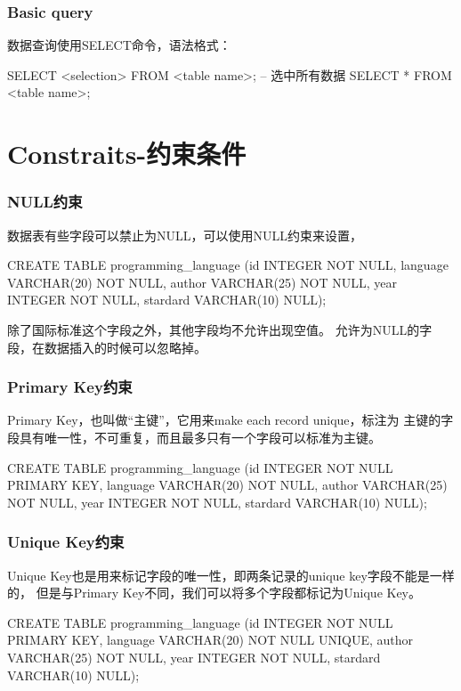 \documentclass[a4paper,11pt]{article}
\begin{document}
\section[Basic query]{Basic query}
数据查询使用SELECT命令，语法格式：

\begin{sqlcode}
SELECT <selection> FROM <table name>;
-- 选中所有数据
SELECT * FROM <table name>;
\end{sqlcode}


\part[Constraits-约束条件]{Constraits-约束条件}
\section[NULL约束]{NULL约束}
数据表有些字段可以禁止为NULL，可以使用NULL约束来设置，

\begin{sqlcode}
CREATE TABLE programming_language
(id INTEGER NOT NULL,
 language VARCHAR(20) NOT NULL,
 author VARCHAR(25) NOT NULL,
 year INTEGER NOT NULL,
 stardard VARCHAR(10) NULL);
\end{sqlcode}

除了国际标准这个字段之外，其他字段均不允许出现空值。
允许为NULL的字段，在数据插入的时候可以忽略掉。

\section[Primary Key约束]{Primary Key约束}
Primary Key，也叫做“主键”，它用来make each record unique，标注为
主键的字段具有唯一性，不可重复，而且最多只有一个字段可以标准为主键。

\begin{sqlcode}
CREATE TABLE programming_language
(id INTEGER NOT NULL PRIMARY KEY,
 language VARCHAR(20) NOT NULL,
 author VARCHAR(25) NOT NULL,
 year INTEGER NOT NULL,
 stardard VARCHAR(10) NULL);
\end{sqlcode}

\section[Unique Key约束]{Unique Key约束}
Unique Key也是用来标记字段的唯一性，即两条记录的unique key字段不能是一样的，
但是与Primary Key不同，我们可以将多个字段都标记为Unique Key。

\begin{sqlcode}
CREATE TABLE programming_language
(id INTEGER NOT NULL PRIMARY KEY,
 language VARCHAR(20) NOT NULL UNIQUE,
 author VARCHAR(25) NOT NULL,
 year INTEGER NOT NULL,
 stardard VARCHAR(10) NULL);
\end{sqlcode}
\end{document}
